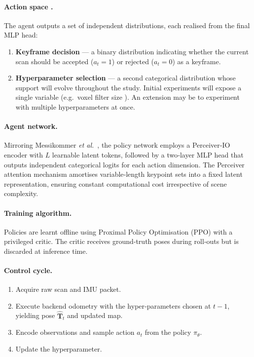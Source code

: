 \documentclass[12pt]{article}
\begin{document}
\paragraph{Action space .}
The agent outputs a set of independent distributions, each realised from the final MLP head:

\begin{enumerate}[label=(\alph*)]
  \item \textbf{Keyframe decision} ---
        a binary distribution indicating whether the current scan should be accepted ($a_t=1$) or rejected ($a_t=0$) as a keyframe.
  \item \textbf{Hyperparameter selection} ---
        a second categorical distribution whose support will evolve throughout the study.  Initial experiments will expose a single variable (e.g.\ voxel filter size ). An extension may be to experiment with multiple hyperparameters at once.
\end{enumerate}

\paragraph{Agent network.}
Mirroring Messikommer \textit{et al.}~\cite{nicomessikommer_2024_reinforcement}, the policy network employs a Perceiver‑IO encoder with $L$ learnable latent tokens, followed by a two‑layer MLP head that outputs independent categorical logits for each action dimension.  The Perceiver attention mechanism amortises variable‑length keypoint sets into a fixed latent representation, ensuring constant computational cost irrespective of scene complexity.

\paragraph{Training algorithm.}
Policies are learnt offline using Proximal Policy Optimisation (PPO) with a privileged critic.  The critic receives ground‑truth poses during roll‑outs but is discarded at inference time.

\paragraph{Control cycle.}
\begin{enumerate}
    \item Acquire raw scan and IMU packet.
    \item Execute backend odometry with the hyper‑parameters chosen at $t\!-\!1$, yielding pose $\hat{\mathbf{T}}_t$ and updated map.
    \item Encode observations and sample action $a_t$ from the policy $\pi_\theta$.
    \item Update the hyperparameter.
\end{enumerate}
\end{document}
